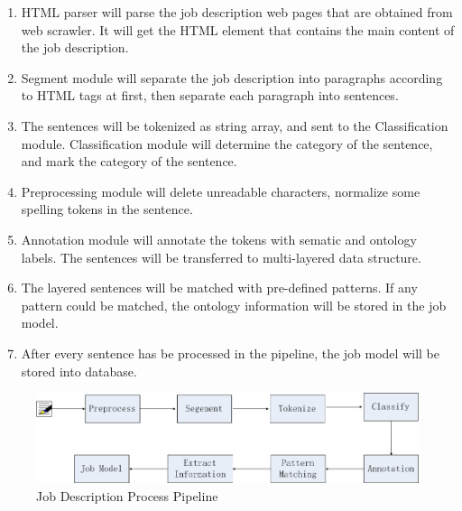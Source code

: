\begin{enumerate}
    \item HTML parser will parse the job description web pages that are obtained from web scrawler. It will get the HTML element that contains the main content of the job description.
    \item Segment module will separate the job description into paragraphs according to HTML tags at first, then separate each paragraph into sentences.
    \item The sentences will be tokenized as string array, and sent to the Classification module. Classification module will determine the category of the sentence, and mark the category of the sentence.
    \item Preprocessing module will delete unreadable characters, normalize some spelling tokens in the sentence.
    \item Annotation module will annotate the tokens with sematic and ontology labels. The sentences will be transferred to multi-layered data structure.
    \item The layered sentences will be matched with pre-defined patterns. If any pattern could be matched, the ontology information will be stored in the job model.
    \item After every sentence has be processed in the pipeline, the job model will be stored into database.
\end{enumerate}


\begin{figure}[htbp]
  \centering
  \includegraphics[scale=0.4]{images/pipeline.png}
  \caption{Job Description Process Pipeline}
  \label{fig:Pipeline}
\end{figure}
